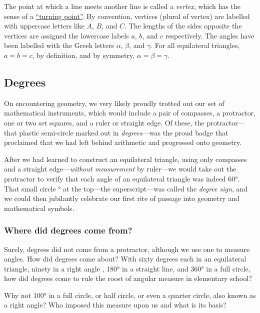 \documentclass[
  a4paper,
]{article}
\begin{document}
The point at which a line meets another line is called a \emph{vertex},
which has the sense of a
\href{https://www.etymonline.com/search?q=vertex}{``turning point''}. By
convention, vertices (plural of vertex) are labelled with uppercase
letters like \(A\), \(B\), and \(C\). The lengths of the sides opposite
the vertices are assigned the lowercase labels \(a\), \(b\), and \(c\)
respectively. The angles have been labelled with the Greek letters
\(\alpha\), \(\beta\), and \(\gamma\). For all equilateral triangles,
\(a = b = c\), by definition, and by symmetry,
\(\alpha = \beta = \gamma\).

\hypertarget{degrees}{%
\subsection{Degrees}\label{degrees}}

On encountering geometry, we very likely proudly trotted out our set of
mathematical instruments, which would include a pair of compasses, a
protractor, one or two set squares, and a ruler or straight edge. Of
these, the protractor---that plastic semi-circle marked out in
\emph{degrees}---was the proud badge that proclaimed that we had left
behind arithmetic and progressed onto geometry.

After we had learned to construct an equilateral triangle, using only
compasses and a straight edge---\emph{without measurement} by ruler---we
would take out the protractor to verify that each angle of an
equilateral triangle was indeed 60°. That small circle ° at the
top---the superscript---was called the \emph{degree sign}, and we could
then jubilantly celebrate our first rite of passage into geometry and
mathematical symbols.

\hypertarget{where-did-degrees-come-from}{%
\subsubsection{Where did degrees come
from?}\label{where-did-degrees-come-from}}

Surely, degrees did not come from a protractor, although we use one to
measure angles. How did degrees come about? With sixty degrees each in
an equilateral triangle, ninety in a right angle , 180° in a straight
line, and 360° in a full circle, how did degrees come to rule the roost
of angular measure in elementary school?

Why not 100° in a full circle, or half circle, or even a quarter circle,
also known as a right angle? Who imposed this measure upon us and what
is its basis?
\end{document}
